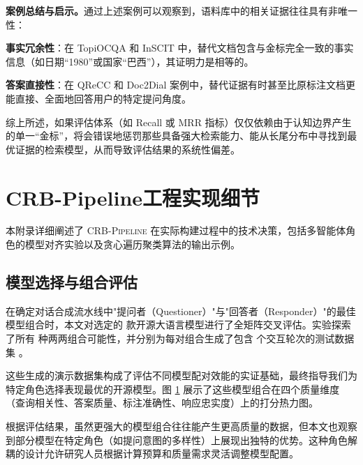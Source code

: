 \textbf{案例总结与启示。}通过上述案例可以观察到，语料库中的相关证据往往具有非唯一性：

\textbf{事实冗余性}：在 TopiOCQA 和 InSCIT 中，替代文档包含与金标完全一致的事实信息（如日期“1980”或国家“巴西”），其证明力是相等的。

\textbf{答案直接性}：在 QReCC 和 Doc2Dial 案例中，替代证据有时甚至比原标注文档更能直接、全面地回答用户的特定提问角度。


综上所述，如果评估体系（如 Recall 或 MRR 指标）仅仅依赖由于认知边界产生的单一“金标”，将会错误地惩罚那些具备强大检索能力、能从长尾分布中寻找到最优证据的检索模型，从而导致评估结果的系统性偏差。


\section{CRB-Pipeline工程实现细节}
\label{app:pipeline_details}

本附录详细阐述了 \textsc{CRB-Pipeline} 在实际构建过程中的技术决策，包括多智能体角色的模型对齐实验以及贪心遍历聚类算法的输出示例。

\subsection{模型选择与组合评估}
\label{subsec:app_model_selection}


\begin{figure}[htbp]
    \centering
    \label{fig:app_model_heatmap}
\end{figure}

在确定对话合成流水线中"提问者（Questioner）"与"回答者（Responder）"的最佳模型组合时，本文对选定的  款开源大语言模型进行了全矩阵交叉评估。实验探索了所有  种两两组合可能性，并分别为每对组合生成了包含  个交互轮次的测试数据集 。

这些生成的演示数据集构成了评估不同模型配对效能的实证基础，最终指导我们为特定角色选择表现最优的开源模型。图 \ref{fig:app_model_heatmap} 展示了这些模型组合在四个质量维度（查询相关性、答案质量、标注准确性、响应忠实度）上的打分热力图。



根据评估结果，虽然更强大的模型组合往往能产生更高质量的数据，但本文也观察到部分模型在特定角色（如提问意图的多样性）上展现出独特的优势。这种角色解耦的设计允许研究人员根据计算预算和质量需求灵活调整模型配置。

